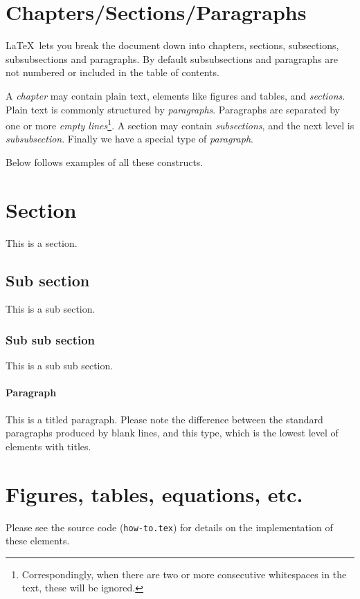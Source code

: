 \section{Chapters/Sections/Paragraphs}

\LaTeX\  lets you break the document down into chapters, sections, subsections, subsubsections and paragraphs. By default subsubsections and paragraphs are not numbered or included in the table of contents. 

A {\em chapter} may contain plain text, elements like figures and tables, and {\em sections}. 
Plain text is commonly structured by {\em paragraphs}. Paragraphs are separated by one or more {\em empty lines}\footnote{Correspondingly, when there are two or more       consecutive          whitespaces in the text, these will be ignored.}. 
A section may contain {\em subsections}, and the next level is {\em subsubsection}.
Finally we have a special type of {\em paragraph}.

Below follows examples of all these constructs.


\section{Section} 
This is a section. \lipsum[10-12]
\subsection{Sub section} 
This is a sub section. \lipsum[13-14]
\subsubsection{Sub sub section} 
This is a sub sub section. \lipsum[15-16]
\paragraph{Paragraph} 
This is a titled paragraph.
Please note the difference between the standard paragraphs produced by blank lines, and this type, which is the lowest level of elements with titles.

\lipsum[17-18]

\section{Figures, tables, equations, etc.}

Please see the source code ({\tt how-to.tex}) for details on the implementation of these elements.

